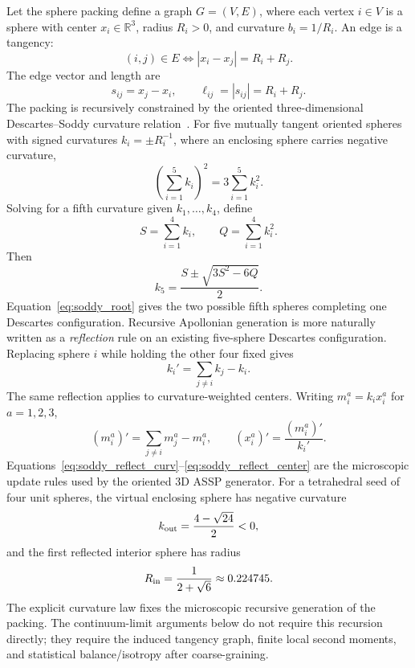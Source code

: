\documentclass[11pt,a4paper]{article}
\newcommand{\R}{\mathbb{R}}
\begin{document}
Let the sphere packing define a graph $G=(V,E)$, where each vertex $i\in V$
is a sphere with center $x_i\in\R^3$, radius $R_i>0$, and curvature
$b_i=1/R_i$. An edge is a tangency:
\begin{equation}
  (i,j)\in E \iff |x_i-x_j|=R_i+R_j.
  \label{eq:tangency}
\end{equation}
The edge vector and length are
\begin{equation}
  s_{ij}=x_j-x_i,\qquad \ell_{ij}=|s_{ij}|=R_i+R_j.
  \label{eq:edge}
\end{equation}
The packing is recursively constrained by the oriented three-dimensional
Descartes--Soddy curvature relation~\cite{Soddy1936,Graham2003}.  For five
mutually tangent oriented spheres with signed curvatures $k_i=\pm R_i^{-1}$,
where an enclosing sphere carries negative curvature,
\begin{equation}
  \left(\sum_{i=1}^{5}k_i\right)^2
  =3\sum_{i=1}^{5}k_i^2.
  \label{eq:soddy_3d}
\end{equation}
Solving for a fifth curvature given $k_1,\ldots,k_4$, define
\begin{equation}
  S=\sum_{i=1}^{4}k_i,\qquad Q=\sum_{i=1}^{4}k_i^2.
\end{equation}
Then
\begin{equation}
  k_5=\frac{S\pm\sqrt{3S^2-6Q}}{2}.
  \label{eq:soddy_root}
\end{equation}
Equation~\eqref{eq:soddy_root} gives the two possible fifth spheres completing
one Descartes configuration.  Recursive Apollonian generation is more naturally
written as a \emph{reflection} rule on an existing five-sphere Descartes
configuration.  Replacing sphere $i$ while holding the other four fixed gives
\begin{equation}
  k_i'=\sum_{j\ne i}k_j-k_i.
  \label{eq:soddy_reflect_curv}
\end{equation}
The same reflection applies to curvature-weighted centers.  Writing
$m_i^a=k_i x_i^a$ for $a=1,2,3$,
\begin{equation}
  (m_i^a)'=\sum_{j\ne i}m_j^a-m_i^a,
  \qquad
  (x_i^a)'=\frac{(m_i^a)'}{k_i'}.
  \label{eq:soddy_reflect_center}
\end{equation}
Equations~\eqref{eq:soddy_reflect_curv}--\eqref{eq:soddy_reflect_center} are
the microscopic update rules used by the oriented 3D ASSP generator.  For a
tetrahedral seed of four unit spheres, the virtual enclosing sphere has
negative curvature
\begin{equation}
  k_{\rm out}=\frac{4-\sqrt{24}}{2}<0,
  \label{eq:outer_curvature}
\end{equation}
and the first reflected interior sphere has radius
\begin{equation}
  R_{\rm in}=\frac{1}{2+\sqrt{6}}\approx0.224745.
\end{equation}
The explicit curvature law fixes the microscopic recursive generation of the
packing.  The continuum-limit arguments below do not require this recursion
directly; they require the induced tangency graph, finite local second moments,
and statistical balance/isotropy after coarse-graining.
\end{document}
